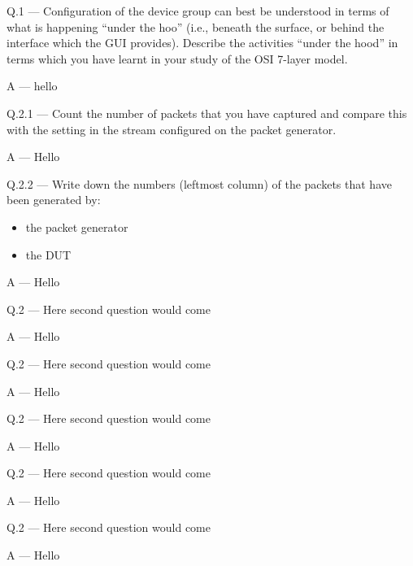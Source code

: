 \documentclass{article}
\newcounter{question}
\begin{document}
\newcommand\Que[2]{%
   \leavevmode\par
   \noindent
   Q.#1 --- #2\par}

\newcommand\Ans[2][]{%
    \leavevmode\par\noindent
   {\leftskip37pt
    A --- \textbf{#1}#2\par}}

\Que{1}{Configuration of the device group can best be understood
   in terms of what is happening ``under the hoo'' (i.e.,
   beneath the surface, or behind the interface which the GUI
   provides). Describe the activities ``under the hood'' in
terms which you have learnt in your study of the OSI 7-layer
model.}
\Ans{hello}

\Que{2.1}{Count the number of packets that you have captured and
compare this with the setting in the stream configured on the
packet generator.}
\Ans{Hello}

\Que{2.2}{Write down the numbers (leftmost column) of the packets that have been generated by:
\begin{itemize}
\item the packet generator
\item the DUT
\end{itemize}
}
\Ans{Hello}


\Que{2}{Here second question would come}
\Ans{Hello}


\Que{2}{Here second question would come}
\Ans{Hello}

\Que{2}{Here second question would come}
\Ans{Hello}

\Que{2}{Here second question would come}
\Ans{Hello}

\Que{2}{Here second question would come}
\Ans{Hello}
\end{document}
